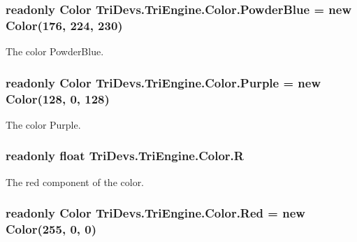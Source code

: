 \hypertarget{struct_tri_devs_1_1_tri_engine_1_1_color_a21cd284bab7cefcbca51a5b8a9fb0439}{
\subsubsection[{Powder\-Blue}]{\setlength{\rightskip}{0pt plus 5cm}readonly {\bf Color} Tri\-Devs.\-Tri\-Engine.\-Color.\-Powder\-Blue = new {\bf Color}(176, 224, 230)\hspace{0.3cm}{\ttfamily [static]}}}\label{struct_tri_devs_1_1_tri_engine_1_1_color_a21cd284bab7cefcbca51a5b8a9fb0439}


The color Powder\-Blue. 

\hypertarget{struct_tri_devs_1_1_tri_engine_1_1_color_afe252b898f58ae1b5b9623b202769025}{
\subsubsection[{Purple}]{\setlength{\rightskip}{0pt plus 5cm}readonly {\bf Color} Tri\-Devs.\-Tri\-Engine.\-Color.\-Purple = new {\bf Color}(128, 0, 128)\hspace{0.3cm}{\ttfamily [static]}}}\label{struct_tri_devs_1_1_tri_engine_1_1_color_afe252b898f58ae1b5b9623b202769025}


The color Purple. 

\hypertarget{struct_tri_devs_1_1_tri_engine_1_1_color_ab31693fb99effc5b2b761a6f53f247ca}{
\subsubsection[{R}]{\setlength{\rightskip}{0pt plus 5cm}readonly float Tri\-Devs.\-Tri\-Engine.\-Color.\-R}}\label{struct_tri_devs_1_1_tri_engine_1_1_color_ab31693fb99effc5b2b761a6f53f247ca}


The red component of the color. 

\hypertarget{struct_tri_devs_1_1_tri_engine_1_1_color_a136ec790362a549d222325f44ea91942}{
\subsubsection[{Red}]{\setlength{\rightskip}{0pt plus 5cm}readonly {\bf Color} Tri\-Devs.\-Tri\-Engine.\-Color.\-Red = new {\bf Color}(255, 0, 0)\hspace{0.3cm}{\ttfamily [static]}}}\label{struct_tri_devs_1_1_tri_engine_1_1_color_a136ec790362a549d222325f44ea91942}


